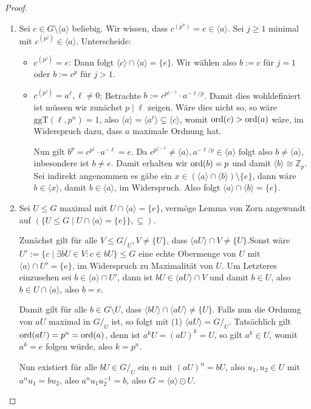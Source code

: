 \begin{proof}{\ }
    \begin{enumerate}
        \item Sei $c \in G \setminus \langle a \rangle$ beliebig. Wir wissen, dass $c^{(p^n)} = e \in \langle a \rangle$. Sei $j \geq 1$ minimal mit $c^{(p^j)} \in \langle a \rangle$. Unterscheide:
        \begin{itemize}
            \item $c^{(p^j)} = e$: Dann folgt $\langle c \rangle \cap \langle a \rangle = \{e\}$. Wir wählen also $b := c$ für $j = 1$ oder $b := c^p$ für $j > 1$.
            \item $c^{(p^j)} = a^\ell, \ell \neq 0$: Betrachte $b := c^{p^{j-1}} \cdot a^{-\ell / p}$. Damit dies wohldefiniert ist müssen wir zunächst $p \mid \ell$ zeigen. Wäre dies nicht so, so wäre $\mathrm{ggT}(\ell, p^n) = 1$, also $\langle a \rangle = \langle a^\ell \rangle \subsetneq \langle c \rangle$, womit $\operatorname{ord}(c) > \operatorname{ord}(a)$ wäre, im Widerspruch dazu, dass $a$ maximale Ordnung hat.
            
            Nun gilt $b^p = c^{p^j} \cdot a^{- \ell} = e$. Da $c^{p^{j-1}} \neq \langle a \rangle, a^{-\ell / p} \in \langle a \rangle$ folgt also $b \neq \langle a \rangle$, inbesondere ist $b \neq e$. Damit erhalten wir $\operatorname{ord}(b) = p$ und damit $\langle b \rangle \cong \mathbb{Z}_p$. Sei indirekt angenommen es gäbe ein $x \in (\langle a \rangle \cap \langle b \rangle) \setminus \{e\}$, dann wäre $b \in \langle x \rangle$, damit $b \in \langle a \rangle$, im Widerspruch. Also folgt $\langle a \rangle \cap \langle b \rangle = \{e\}$.
        \end{itemize}

        \item Sei $U \leq G$ maximal mit $U \cap \langle a \rangle = \{e\}$, vermöge Lemma von Zorn angewandt auf $(\{ U \leq G \mid U \cap \langle a \rangle = \{e\} \}, \subseteq)$.
        
        Zunächst gilt für alle $V \leq G/_U, V \neq \{ U \}$, dass $\langle aU \rangle \cap V \neq \{ U \}$.Sonst wäre $U' := \{ c \mid \exists b U \in V: c \in bU \} \leq G$ eine echte Obermenge von $U$ mit $\langle a \rangle \cap U' = \{e\}$, im Widerspruch zu Maximalität von $U$. Um Letzteres einzusehen sei $b \in \langle a \rangle \cap U'$, dann ist $bU \in \langle aU \rangle \cap V$ und damit $b \in U$, also $b \in U \cap \langle a \rangle$, also $b = e$. 
        
        Damit gilt für alle $b \in G \setminus U$, dass $\langle bU \rangle \cap \langle aU \rangle \neq \{ U \}$. Falls nun die Ordnung von $aU$ maximal in $G/_U$ ist, so folgt mit (1) $\langle a U \rangle = G/_U$. Tatsächlich gilt $\operatorname{ord}(aU) = p^n = \operatorname{ord}(a)$, denn ist $a^k U = (aU)^k = U$, so gilt $a^k \in U$, womit $a^k = e$ folgen würde, also $k = p^n$.

        Nun existiert für alle $bU \in G/_U$ ein $n$ mit $(aU)^n = bU$, also $u_1, u_2 \in U$ mit $a^n u_1 = b u_2$, also $a^n u_1 u_2^{-1} = b$, also $G = \langle a \rangle \odot U$.
    \end{enumerate}
\end{proof}

